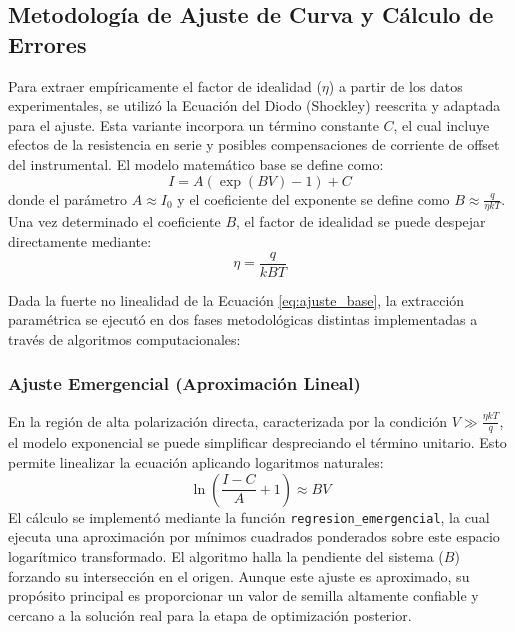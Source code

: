 \documentclass[conference]{IEEEtran}
\begin{document}
\subsection{Metodología de Ajuste de Curva y Cálculo de Errores}
\label{subsec:metodologia_ajuste}

Para extraer empíricamente el factor de idealidad ($\eta$) a partir de los datos experimentales, se utilizó la Ecuación del Diodo (Shockley) reescrita y adaptada para el ajuste. Esta variante incorpora un término constante $C$, el cual incluye efectos de la resistencia en serie y posibles compensaciones de corriente de offset del instrumental. El modelo matemático base se define como:
\begin{equation}
    I = A \left( \exp(B V) - 1 \right) + C
    \label{eq:ajuste_base}
\end{equation}
donde el parámetro $A \approx I_0$ y el coeficiente del exponente se define como $B \approx \frac{q}{\eta k T}$. Una vez determinado el coeficiente $B$, el factor de idealidad se puede despejar directamente mediante:
\begin{equation}
    \eta = \frac{q}{k B T}
    \label{eq:factor_idealidad_b}
\end{equation}

Dada la fuerte no linealidad de la Ecuación \ref{eq:ajuste_base}, la extracción paramétrica se ejecutó en dos fases metodológicas distintas implementadas a través de algoritmos computacionales:

\subsubsection{Ajuste Emergencial (Aproximación Lineal)}
En la región de alta polarización directa, caracterizada por la condición $V \gg \frac{\eta k T}{q}$, el modelo exponencial se puede simplificar despreciando el término unitario. Esto permite linealizar la ecuación aplicando logaritmos naturales:
\begin{equation}
    \ln\left( \frac{I - C}{A} + 1 \right) \approx B V
\end{equation}
El cálculo se implementó mediante la función \texttt{regresion\_emergencial}, la cual ejecuta una aproximación por mínimos cuadrados ponderados sobre este espacio logarítmico transformado. El algoritmo halla la pendiente del sistema ($B$) forzando su intersección en el origen. Aunque este ajuste es aproximado, su propósito principal es proporcionar un valor de semilla altamente confiable y cercano a la solución real para la etapa de optimización posterior.
\end{document}
